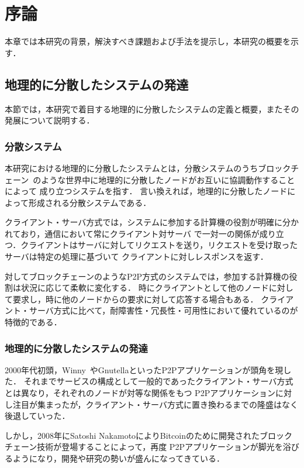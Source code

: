\chapter{序論}
\label{introduction}

本章では本研究の背景，解決すべき課題および手法を提示し，本研究の概要を示す．

\section{地理的に分散したシステムの発達}
\label{introduction:system-growth}

本節では，本研究で着目する地理的に分散したシステムの定義と概要，またその発展について説明する．

\subsection{分散システム}

本研究における地理的に分散したシステムとは，分散システムのうちブロックチェーン~\cite{Bitcoin}のような世界中に地理的に分散したノードがお互いに協調動作することによって
成り立つシステムを指す．
言い換えれば，地理的に分散したノードによって形成される分散システムである．

クライアント・サーバ方式では，システムに参加する計算機の役割が明確に分かれており，通信において常にクライアント対サーバ
で一対一の関係が成り立つ．クライアントはサーバに対してリクエストを送り，リクエストを受け取ったサーバは特定の処理に基づいて
クライアントに対しレスポンスを返す．

対してブロックチェーンのようなP2P方式のシステムでは，参加する計算機の役割は状況に応じて柔軟に変化する．
時にクライアントとして他のノードに対して要求し，時に他のノードからの要求に対して応答する場合もある．
クライアント・サーバ方式に比べて，耐障害性・冗長性・可用性において優れているのが特徴的である．

\subsection{地理的に分散したシステムの発達}

2000年代初頭，Winny~\cite{Winny}やGnutellaといったP2Pアプリケーションが頭角を現した．
それまでサービスの構成として一般的であったクライアント・サーバ方式とは異なり，それぞれのノードが対等な関係をもつ
P2Pアプリケーションに対し注目が集まったが，クライアント・サーバ方式に置き換わるまでの隆盛はなく後退していった．

しかし，2008年にSatoshi NakamotoによりBitcoinのために開発されたブロックチェーン技術が登場することによって，再度
P2Pアプリケーションが脚光を浴びるようになり，開発や研究の勢いが盛んになってきている．

